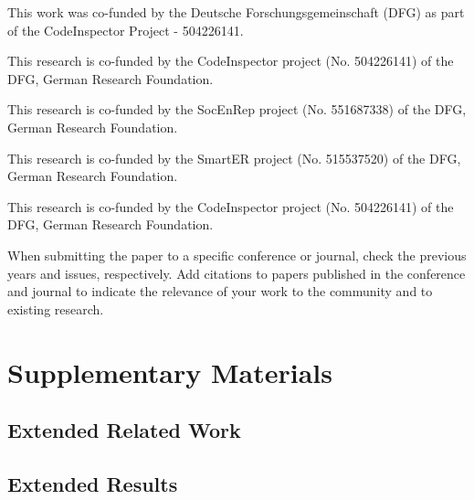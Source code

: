 \documentclass[sigconf, review, nonacm]{acmart}
\begin{document}
\begin{acks}
This work was co-funded by the Deutsche Forschungsgemeinschaft (DFG) as part of the
CodeInspector Project - 504226141.

This research is co-funded by the CodeInspector project (No. 504226141) of the DFG, German Research Foundation.

This research is co-funded by the SocEnRep project (No. 551687338) of the DFG, German Research Foundation.

This research is co-funded by the SmartER project (No.
515537520) of the DFG, German Research Foundation.

This research is co-funded by the CodeInspector project (No. 504226141) of the DFG, German Research Foundation.

\end{acks}

\begin{tcolorbox}[title=Is this paper a submission to a specific conference or journal?]
When submitting the paper to a specific conference or journal, check the previous years and issues, respectively.
Add citations to papers published in the conference and journal to indicate the relevance of your work to the community and to existing research.
\end{tcolorbox}




\newpage

\appendix

\section{Supplementary Materials}
\label{appendix:supplementarymaterials}


\subsection{Extended Related Work}
\label{appendix:extendedrelatedwork}

\subsection{Extended Results}
\label{appendix:extendedresults}
\end{document}
